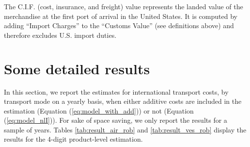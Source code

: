 \documentclass[a4paper,11pt]{article}
\begin{document}
The C.I.F. (cost, insurance, and freight) value represents the landed value of the merchandise at the first port of arrival in the United States. It is computed by adding ``Import Charges'' to the ``Customs Value'' (see definitions above) and therefore excludes U.S. import duties.

\section{Some detailed results}

In this section, we report the estimates for international transport costs, by transport mode on a yearly basis, when either additive costs are included in the estimation (Equation (\ref{eq:model_with_add})) or not (Equation (\ref{eq:model_nlI})). For sake of space saving, we only report the results for a sample of years. Tables \ref{tab:result_air_rob} and \ref{tab:result_ves_rob} display the results for the 4-digit product-level estimation.
\end{document}
